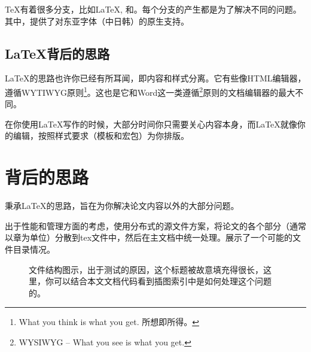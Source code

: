 \TeX{}有着很多分支，比如\LaTeX{}, \LuaTeX{}和\XeTeX{}。每个分支的产生都是为了解决不同的问题。其中，\XeTeX{}提供了对东亚字体（中日韩）的原生支持。


\subsection{\LaTeX{}背后的思路}

\LaTeX{}的思路也许你已经有所耳闻，即{\heiti{}内容和样式分离。}它有些像HTML编辑器，遵循\textsf{WYTIWYG}原则\footnote{What you think is what you get. 所想即所得。}。这也是它和Word这一类遵循\footnote{\textsf{WYSIWYG} -- What you see is what you get.}原则的文档编辑器的最大不同。

在你使用\LaTeX{}写作的时候，大部分时间你只需要关心内容本身，而\LaTeX{}就像你的编辑，按照样式要求（模板和宏包）为你排版。


\section{\PRCthesis{}背后的思路}

\PRCthesis{}秉承\LaTeX{}的思路，旨在为你解决论文内容以外的大部分问题。

出于性能和管理方面的考虑，\PRCthesis{}使用分布式的源文件方案，将论文的各个部分（通常以章为单位）分散到tex文件中，然后在主文档中统一处理。展示了一个可能的文件目录情况。
\begin{figure}[htb]
\caption[\PRCthesis{}文件结构图示]{\PRCthesis{}文件结构图示，出于测试的原因，这个标题被故意填充得很长，这里，你可以结合本文文档代码看到插图索引中是如何处理这个问题的。}
\label{fig:filetree}
\end{figure}






